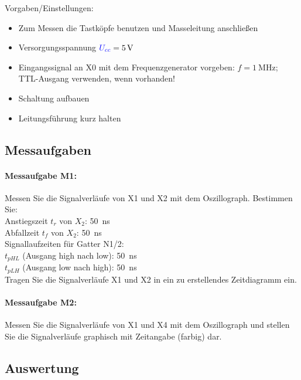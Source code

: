 \documentclass[11pt,a4paper,titlepage]{scrreprt}
\begin{document}
      Vorgaben/Einstellungen:
      \begin{itemize}
        \setlength\itemsep{-1em}
        \item Zum Messen die Tastköpfe benutzen und Masseleitung anschließen
        \item Versorgungsspannung $\textcolor{blue}{U_{cc}} = \SI{5}{\volt}$
        \item Eingangssignal an X0 mit dem Frequenzgenerator vorgeben: $f = \SI{1}{\mega\Hz}$; TTL-Ausgang verwenden, wenn vorhanden!
        \item Schaltung aufbauen
        \item Leitungsführung kurz halten
      \end{itemize}

      \subsection{Messaufgaben}
        \paragraph{Messaufgabe M1:} Messen Sie die Signalverläufe von X1 und X2 mit dem Oszillograph. Bestimmen Sie:\\

          Anstiegszeit $t_r$ von $X_2$: \SI{50}{\nano\second}\\
          Abfallzeit $t_f$ von $X_2$: \SI{50}{\nano\second}\\

          Signallaufzeiten für Gatter N1/2:\\
          $t_{pHL}$ (Ausgang high nach low): \SI{50}{\nano\second}\\
          $t_{pLH}$ (Ausgang low nach high): \SI{50}{\nano\second}\\

          Tragen Sie die Signalverläufe X1 und X2 in ein zu erstellendes Zeitdiagramm ein.


        \paragraph{Messaufgabe M2:} Messen Sie die Signalverläufe von X1 und X4 mit dem Oszillograph und stellen Sie die
          Signalverläufe graphisch mit Zeitangabe (farbig) dar.

      \subsection{Auswertung}
\end{document}
